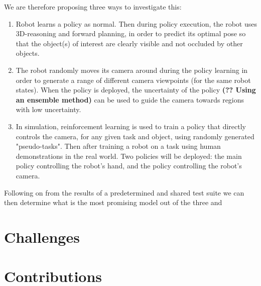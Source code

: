     We are therefore proposing three ways to investigate this:
    \begin{enumerate}
        \item Robot learns a policy as normal. Then during policy execution, the robot uses 3D-reasoning and forward planning, in order to predict its optimal pose so that the object(s) of interest are clearly visible and not occluded by other objects.
        \item The robot randomly moves its camera around during the policy learning in order to generate a range of different camera viewpoints (for the same robot states). When the policy is deployed, the uncertainty of the policy \textbf{(?? Using an ensemble method)} can be used to guide the camera towards regions with low uncertainty.
        \item In simulation, reinforcement learning is used to train a policy that directly controls the camera, for any given task and object, using randomly generated "pseudo-tasks". Then after training a robot on a task using human demonstrations in the real world. Two policies will be deployed: the main policy controlling the robot's hand, and the policy controlling the robot's camera.
    \end{enumerate}

    Following on from the results of a predetermined and shared test suite we can then determine what is the most promising model out of the three and 
\section{Challenges} %
\section{Contributions}